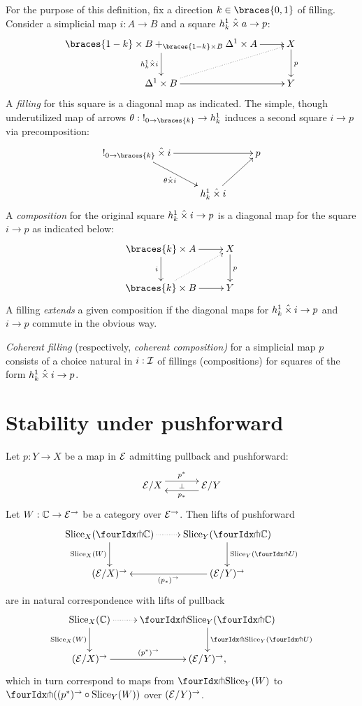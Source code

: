 \documentclass[reqno,10pt,a4paper,oneside]{amsart}
\begin{document}
\begin{definition}
For the purpose of this definition, fix a direction $k \in \braces{0, 1}$ of filling.
Consider a simplicial map $i : A \to B$ and a square $h_k^1 \hattimes a \to p$:
\[
\xymatrix{
  \braces{1-k} \times B +_{\braces{1-k} \times B} \Delta^1 \times A
  \ar[r]
  \ar[d]_{h_k^1 \hattimes i}
&
  X
  \ar[d]^{p}
\\
  \Delta^1 \times B
  \ar[r]
  \ar@{.>}[ur]
&
  Y
}
\]
A \emph{filling} for this square is a diagonal map as indicated.
The simple, though underutilized map of arrows $\theta : \canonical_{0 \to \braces{k}} \to h_k^1$ induces a second square $i \to p$ via precomposition:
\[
\xymatrix{
  \canonical_{0 \to \braces{k}} \hattimes i
  \ar[rr]
  \ar[dr]_{\theta \hattimes i}
&&
  p
\\&
  h_k^1 \hattimes i
  \ar[ur]
}
\]
A \emph{composition} for the original square $h_k^1 \hattimes i \to p$ is a diagonal map for the square $i \to p$ as indicated below:
\[
\xymatrix{
  \braces{k} \times A
  \ar[r]
  \ar[d]_{i}
&
  X
  \ar[d]^{p}
\\
  \braces{k} \times B
  \ar[r]
  \ar@{.>}[ur]
&
  Y
}
\]
A filling \emph{extends} a given composition if the diagonal maps for $h_k^1 \hattimes i \to p$ and $i \to p$ commute in the obvious way.
\end{definition}

\begin{definition}
\emph{Coherent filling} (respectively, \emph{coherent composition)} for a simplicial map $p$ consists of a choice natural in $i : \cal{I}$ of fillings (compositions) for squares of the form $h_k^1 \hattimes i \to p$.
\end{definition}




\section{Stability under pushforward}

\begin{lemma}
\label{lift-dependent-product}
Let $p : Y \to X$ be a map in $\catE$ admitting pullback and pushforward:
\[
\xymatrix@C+1em{
  \catE/X
  \ar@<5pt>[r]^{p^*}
  \ar@{}[r]|{\bot}
&
  \catE/Y
  \ar@<5pt>[l]^{p_*}
}
\]
Let $W : \cat{C} \to \catE^{\to}$ be a category over $\catE^{\to}$.
Then lifts of pushforward
\[
\xymatrix{
  \Slice_X(\liftr{\cat{C}})
  \ar@{.>}[r]
  \ar[d]_{\Slice_X(W)}
&
  \Slice_Y(\liftr{\cat{C}})
  \ar[d]^{\Slice_Y(\liftr{U})}
\\
  (\catE/X)^{\to}
&
  (\catE/Y)^{\to}
  \ar[l]^{(p_*)^{\to}}
}
\]
are in natural correspondence with lifts of pullback
\[
\xymatrix{
  \Slice_X(\cat{C})
  \ar@{.>}[r]
  \ar[d]_{\Slice_X(W)}
&
  \liftl{\Slice_Y(\liftr{\cat{C}})}
  \ar[d]^{\liftl{\Slice_Y(\liftr{U})}}
\\
  (\catE/X)^{\to}
  \ar[r]^{(p^*)^{\to}}
&
  (\catE/Y)^{\to},
}
\]
which in turn correspond to maps from $\liftr{\Slice_Y(W)}$ to $\liftr{((p^*)^{\to} \cc \Slice_Y(W))}$ over $(\catE/Y)^{\to}$.
\end{lemma}
\end{document}
